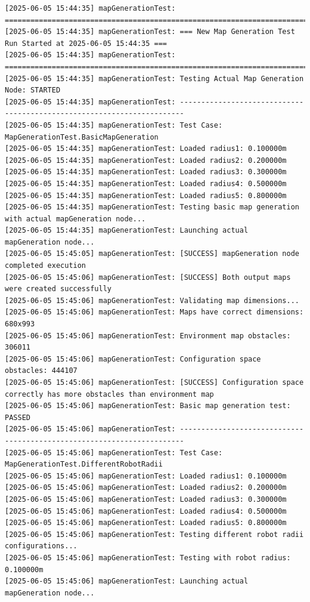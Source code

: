 \documentclass{CSSRforAfrica}
\begin{document}
\begin{landscape}
\begin{verbatim}
[2025-06-05 15:44:35] mapGenerationTest: =======================================================================
[2025-06-05 15:44:35] mapGenerationTest: === New Map Generation Test Run Started at 2025-06-05 15:44:35 ===
[2025-06-05 15:44:35] mapGenerationTest: =======================================================================
[2025-06-05 15:44:35] mapGenerationTest: Testing Actual Map Generation Node: STARTED
[2025-06-05 15:44:35] mapGenerationTest: -----------------------------------------------------------------------
[2025-06-05 15:44:35] mapGenerationTest: Test Case: MapGenerationTest.BasicMapGeneration
[2025-06-05 15:44:35] mapGenerationTest: Loaded radius1: 0.100000m
[2025-06-05 15:44:35] mapGenerationTest: Loaded radius2: 0.200000m
[2025-06-05 15:44:35] mapGenerationTest: Loaded radius3: 0.300000m
[2025-06-05 15:44:35] mapGenerationTest: Loaded radius4: 0.500000m
[2025-06-05 15:44:35] mapGenerationTest: Loaded radius5: 0.800000m
[2025-06-05 15:44:35] mapGenerationTest: Testing basic map generation with actual mapGeneration node...
[2025-06-05 15:44:35] mapGenerationTest: Launching actual mapGeneration node...
[2025-06-05 15:45:05] mapGenerationTest: [SUCCESS] mapGeneration node completed execution
[2025-06-05 15:45:06] mapGenerationTest: [SUCCESS] Both output maps were created successfully
[2025-06-05 15:45:06] mapGenerationTest: Validating map dimensions...
[2025-06-05 15:45:06] mapGenerationTest: Maps have correct dimensions: 680x993
[2025-06-05 15:45:06] mapGenerationTest: Environment map obstacles: 306011
[2025-06-05 15:45:06] mapGenerationTest: Configuration space obstacles: 444107
[2025-06-05 15:45:06] mapGenerationTest: [SUCCESS] Configuration space correctly has more obstacles than environment map
[2025-06-05 15:45:06] mapGenerationTest: Basic map generation test: PASSED
[2025-06-05 15:45:06] mapGenerationTest: -----------------------------------------------------------------------
[2025-06-05 15:45:06] mapGenerationTest: Test Case: MapGenerationTest.DifferentRobotRadii
[2025-06-05 15:45:06] mapGenerationTest: Loaded radius1: 0.100000m
[2025-06-05 15:45:06] mapGenerationTest: Loaded radius2: 0.200000m
[2025-06-05 15:45:06] mapGenerationTest: Loaded radius3: 0.300000m
[2025-06-05 15:45:06] mapGenerationTest: Loaded radius4: 0.500000m
[2025-06-05 15:45:06] mapGenerationTest: Loaded radius5: 0.800000m
[2025-06-05 15:45:06] mapGenerationTest: Testing different robot radii configurations...
[2025-06-05 15:45:06] mapGenerationTest: Testing with robot radius: 0.100000m
[2025-06-05 15:45:06] mapGenerationTest: Launching actual mapGeneration node...

\end{verbatim}
\end{landscape}
\end{document}
